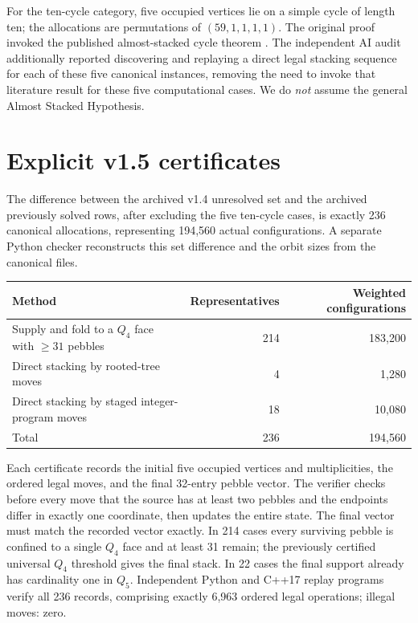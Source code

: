 \documentclass[11pt,a4paper]{article}
\begin{document}
For the ten-cycle category, five occupied vertices lie on a simple cycle of length ten; the allocations are permutations of $(59,1,1,1,1)$. The original proof invoked the published almost-stacked cycle theorem \cite{CSASH}. The independent AI audit additionally reported discovering and replaying a direct legal stacking sequence for each of these five canonical instances, removing the need to invoke that literature result for these five computational cases. We do \emph{not} assume the general Almost Stacked Hypothesis.

\section{Explicit v1.5 certificates}
The difference between the archived v1.4 unresolved set and the archived previously solved rows, after excluding the five ten-cycle cases, is exactly 236 canonical allocations, representing 194,560 actual configurations. A separate Python checker reconstructs this set difference and the orbit sizes from the canonical files.

\begin{center}
\begin{tabular}{lrr}
\toprule
Method & Representatives & Weighted configurations\\\midrule
Supply and fold to a $Q_4$ face with $\ge31$ pebbles & 214 & 183,200\\
Direct stacking by rooted-tree moves & 4 & 1,280\\
Direct stacking by staged integer-program moves & 18 & 10,080\\\midrule
Total & 236 & 194,560\\\bottomrule
\end{tabular}
\end{center}

Each certificate records the initial five occupied vertices and multiplicities, the ordered legal moves, and the final 32-entry pebble vector. The verifier checks before every move that the source has at least two pebbles and the endpoints differ in exactly one coordinate, then updates the entire state. The final vector must match the recorded vector exactly. In 214 cases every surviving pebble is confined to a single $Q_4$ face and at least 31 remain; the previously certified universal $Q_4$ threshold gives the final stack. In 22 cases the final support already has cardinality one in $Q_5$. Independent Python and C++17 replay programs verify all 236 records, comprising exactly 6,963 ordered legal operations; illegal moves: zero.
\end{document}
